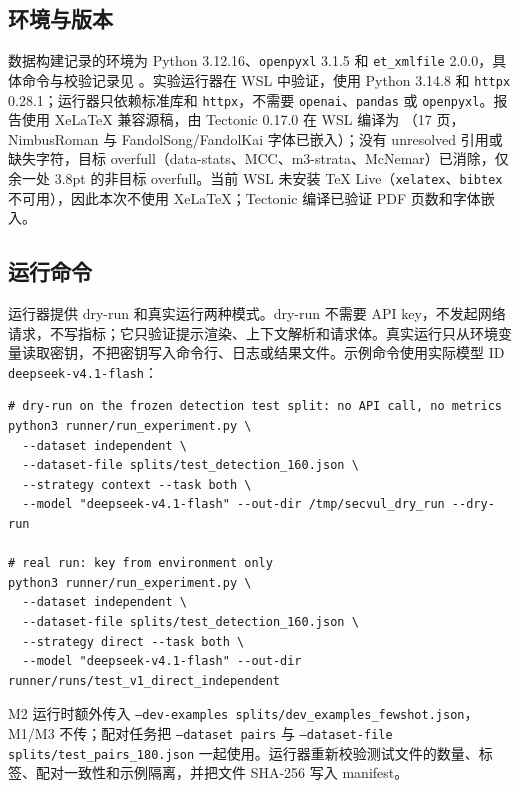 \documentclass[conference]{IEEEtran}
\begin{document}
\subsection{环境与版本}
数据构建记录的环境为 Python 3.12.16、\texttt{openpyxl} 3.1.5 和 \texttt{et\_xmlfile} 2.0.0，具体命令与校验记录见 。实验运行器在 WSL 中验证，使用 Python 3.14.8 和 \texttt{httpx} 0.28.1；运行器只依赖标准库和 \texttt{httpx}，不需要 \texttt{openai}、\texttt{pandas} 或 \texttt{openpyxl}。报告使用 XeLaTeX 兼容源稿，由 Tectonic 0.17.0 在 WSL 编译为 （17 页，NimbusRoman 与 FandolSong/FandolKai 字体已嵌入）；没有 unresolved 引用或缺失字符，目标 overfull（data-stats、MCC、m3-strata、McNemar）已消除，仅余一处 3.8pt 的非目标 overfull。当前 WSL 未安装 TeX Live（\texttt{xelatex}、\texttt{bibtex} 不可用），因此本次不使用 XeLaTeX；Tectonic 编译已验证 PDF 页数和字体嵌入。

\subsection{运行命令}
运行器提供 dry-run 和真实运行两种模式。dry-run 不需要 API key，不发起网络请求，不写指标；它只验证提示渲染、上下文解析和请求体。真实运行只从环境变量读取密钥，不把密钥写入命令行、日志或结果文件。示例命令使用实际模型 ID \texttt{deepseek-v4.1-flash}：

\begin{lstlisting}
# dry-run on the frozen detection test split: no API call, no metrics
python3 runner/run_experiment.py \
  --dataset independent \
  --dataset-file splits/test_detection_160.json \
  --strategy context --task both \
  --model "deepseek-v4.1-flash" --out-dir /tmp/secvul_dry_run --dry-run

# real run: key from environment only
python3 runner/run_experiment.py \
  --dataset independent \
  --dataset-file splits/test_detection_160.json \
  --strategy direct --task both \
  --model "deepseek-v4.1-flash" --out-dir runner/runs/test_v1_direct_independent
\end{lstlisting}
M2 运行时额外传入 \texttt{--dev-examples splits/dev\_examples\_fewshot.json}，M1/M3 不传；配对任务把 \texttt{--dataset pairs} 与 \texttt{--dataset-file splits/test\_pairs\_180.json} 一起使用。运行器重新校验测试文件的数量、标签、配对一致性和示例隔离，并把文件 SHA-256 写入 manifest。
\end{document}
